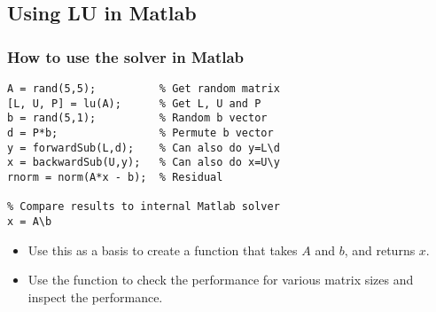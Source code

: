 \documentclass[11pt,table,final,xcolor={usenames,dvipsnames,table}]{beamer}
\begin{document}

\subsection*{Using LU in Matlab}
\begin{frame}[fragile]
  \frametitle{How to use the solver in Matlab}
  \begin{lstlisting}
A = rand(5,5);          % Get random matrix
[L, U, P] = lu(A);      % Get L, U and P
b = rand(5,1);          % Random b vector
d = P*b;                % Permute b vector
y = forwardSub(L,d);    % Can also do y=L\d
x = backwardSub(U,y);   % Can also do x=U\y
rnorm = norm(A*x - b);  % Residual

% Compare results to internal Matlab solver
x = A\b
  \end{lstlisting}
  \pause
  \begin{itemize}
     \item Use this as a basis to create a function that takes $A$ and $b$, and returns $x$.
     \item Use the function to check the performance for various matrix sizes and inspect the performance.
  \end{itemize}

\end{frame}
\end{document}
